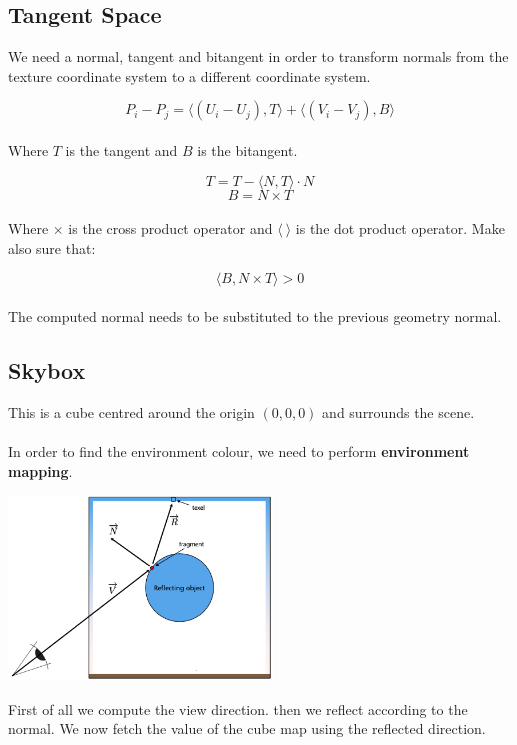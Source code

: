\documentclass{article}
\begin{document}
\subsection{Tangent Space}
We need a normal, tangent and bitangent in order to transform normals from the texture coordinate system to a different coordinate system.

\[ P_i - P_j = \langle (U_i - U_j), T \rangle + \langle (V_i - V_j), B \rangle \] \\
Where $T$ is the tangent and $B$ is the bitangent.

\[ T = T - \langle N, T \rangle \cdot N \]
\[ B = N \times T \] \\
Where $\times$ is the cross product operator and $\langle ~ \rangle$ is the dot product operator. Make also sure that:

\[ \langle B, N \times T \rangle > 0 \] \\
The computed normal needs to be substituted to the previous geometry normal.

\subsection{Skybox}
This is a cube centred around the origin $(0,0,0)$ and surrounds the scene. \\ \\
In order to find the environment colour, we need to perform \textbf{environment mapping}.

\begin{center}
	\includegraphics[width=7cm]{skybox.png}
\end{center}
\vspace{.3cm}
First of all we compute the view direction. then we reflect according to the normal. We now fetch the value of the cube map using the reflected direction.
\end{document}
